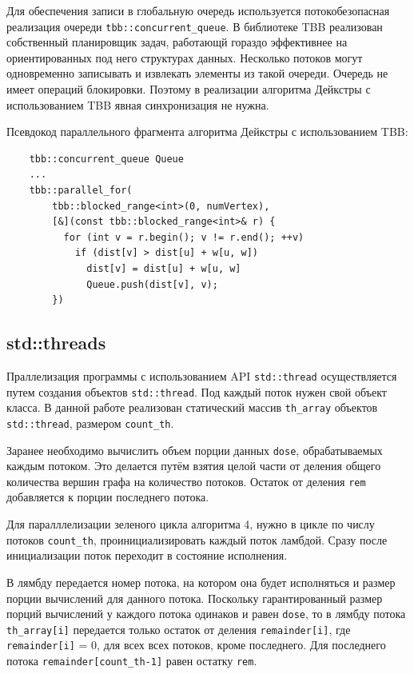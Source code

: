 \documentclass{article}
\begin{document}
\par Для обеспечения записи в глобальную очередь используется потокобезопасная реализация очереди \verb|tbb::concurrent_queue|. В библиотеке TBB реализован собственный планировщик задач, работающй гораздо эффективнее на ориентированных под него структурах данных. Несколько потоков могут одновременно записывать и извлекать элементы из такой очереди. Очередь не имеет операций блокировки. Поэтому в реализации алгоритма Дейкстры с использованием TBB явная  синхронизация не нужна.

\par Псевдокод параллельного фрагмента алгоритма Дейкстры с использованием TBB:

\vspace{10pt}
\begin{lstlisting}
    tbb::concurrent_queue Queue
    ...
    tbb::parallel_for(
        tbb::blocked_range<int>(0, numVertex),
        [&](const tbb::blocked_range<int>& r) {
          for (int v = r.begin(); v != r.end(); ++v)
            if (dist[v] > dist[u] + w[u, w])
              dist[v] = dist[u] + w[u, w]
              Queue.push(dist[v], v);
        })
\end{lstlisting}
\vspace{-25pt}

\subsection{std::threads}
Праллелизация программы с использованием API \verb|std::thread| осуществляется путем создания объектов \verb|std::thread|. Под каждый поток нужен свой объект класса. В данной работе реализован статический массив \verb|th_array| объектов \verb|std::thread|, размером \verb|count_th|.

\par Заранее необходимо вычислить объем порции данных \verb|dose|, обрабатываемых каждым потоком. Это делается путём взятия целой части от деления общего количества вершин графа на количество потоков. Остаток от деления \verb|rem| добавляется к порции последнего потока. 

\par Для паралллелизации зеленого цикла алгоритма 4, нужно в цикле по числу потоков \verb|count_th|, проинициализировать каждый поток ламбдой. Сразу после инициализации поток переходит в состояние исполнения. 

\par В лямбду передается номер потока, на котором она будет исполняться и размер порции вычислений для данного потока. Поскольку гарантированный размер порций вычислений у каждого потока одинаков и равен \verb|dose|, то в лямбду потока \verb|th_array[i]| передается только остаток от деления \verb|remainder[i]|, где \verb|remainder[i]| = 0, для всех всех потоков, кроме последнего. Для последнего потока  
\verb|remainder[count_th-1]| равен остатку \verb|rem|.
\end{document}
